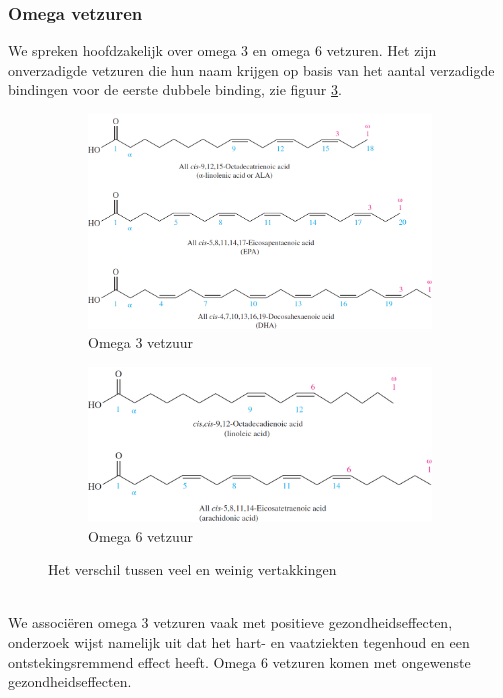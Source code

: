 \documentclass[a4paper,kul]{kulakarticle} %
\begin{document}
\subsubsection{Omega vetzuren}
We spreken hoofdzakelijk over omega 3 en omega 6 vetzuren. Het zijn onverzadigde vetzuren die hun naam krijgen op basis van het aantal verzadigde bindingen voor de eerste dubbele binding, zie figuur \ref{fig:omegaVZ}. 
\begin{figure}[h]
	\centering
	\begin{subfigure}{.5\textwidth}
		\centering
		\includegraphics[width=1\linewidth]{Omega3VZ}
		\caption{Omega 3 vetzuur}
		\label{fig:Omega3}
	\end{subfigure}%
	\begin{subfigure}{.5\textwidth}
		\centering
		\includegraphics[width=1\linewidth]{Omega6VZ}
		\caption{Omega 6 vetzuur}
		\label{fig:Omega6}
	\end{subfigure}
	\caption{Het verschil tussen veel en weinig vertakkingen}
	\label{fig:omegaVZ}
\end{figure}\\
We associëren omega 3 vetzuren vaak met positieve gezondheidseffecten, onderzoek wijst namelijk uit dat het hart- en vaatziekten tegenhoud en een ontstekingsremmend effect heeft. Omega 6 vetzuren komen met ongewenste gezondheidseffecten.
\end{document}

